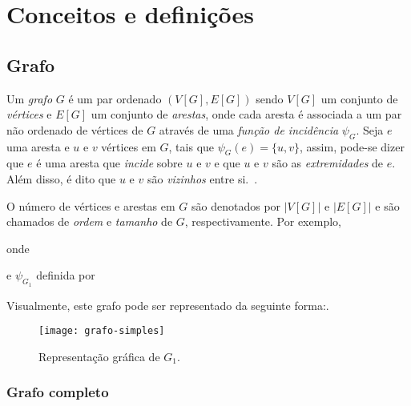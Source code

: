 \chapter{Conceitos e defini{\c   c}{\~o}es}
\label{conceitos}

\section{Grafo}
\label{conceitos__grafo}

Um \emph{grafo} $G$ é um par ordenado $(V[G], E[G])$ sendo $V[G]$ um conjunto de \emph{vértices} e $E[G]$ um conjunto de \emph{arestas}, onde cada aresta é associada a um par não ordenado de vértices de $G$ através de uma \emph{função de incidência} $\psi_{G}$. Seja $e$ uma aresta e $u$ e $v$ vértices em $G$, tais que $\psi_{G}(e) = \{u, v\}$, assim, pode-se dizer que $e$ é uma aresta que \emph{incide} sobre $u$ e $v$ e que $u$ e $v$ são as \emph{extremidades} de $e$. Além disso, é dito que $u$ e $v$ são \emph{vizinhos} entre si.~\cite{bondy1976graph}.

O número de vértices e arestas em $G$ são denotados por $|V[G]|$ e $|E[G]|
$ e são chamados de \emph{ordem} e \emph{tamanho} de $G$, respectivamente. Por exemplo,


\noindent onde



\noindent e $\psi_{G_{1}}$ definida por



Visualmente, este grafo pode ser representado da seguinte forma:.

\begin{figure}[h]
\texttt{[image: grafo-simples]}
\centering
\caption{Representação gráfica de $G_{1}$.}
\label{fig:grafo-simples}
\end{figure}

\subsection{Grafo completo}
\label{conceitos__grafo--comleto}


